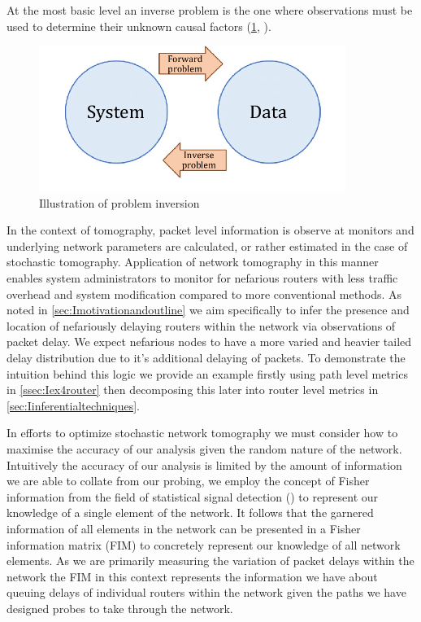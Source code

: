 At the most basic level an inverse problem is the one where observations must be used to determine their unknown causal factors (\cref{fig:probleminv}, \cite{sadri_effect_2019}).
\begin{figure}[H]
    \centering
    \includegraphics[width=10cm]{figs/intro/inverse_problems.png}
    \caption[Illustration of problem inversion]{Illustration of problem inversion \cite{sadri_effect_2019}}
    \label{fig:probleminv}
\end{figure}
In the context of tomography, packet level information is observe at monitors and underlying network parameters are calculated, or rather estimated in the case of stochastic tomography. Application of network tomography in this manner enables system administrators to monitor for nefarious routers with less traffic overhead and system modification compared to more conventional methods. As noted in \cref{sec:Imotivationandoutline} we aim specifically to infer the presence and location of nefariously delaying routers within the network via observations of packet delay. We expect nefarious nodes to have a more varied and heavier tailed delay distribution due to it's additional delaying of packets. To demonstrate the intuition behind this logic we provide an example firstly using path level metrics in \cref{ssec:Iex4router} then decomposing this later into router level metrics in \cref{sec:Iinferentialtechniques}.\par
In efforts to optimize stochastic network tomography we must consider how to maximise the accuracy of our analysis given the random nature of the network. Intuitively the accuracy of our analysis is limited by the amount of information we are able to collate from our probing, we employ the concept of Fisher information from the field of statistical signal detection (\cite{poor_introduction_1994}) to represent our knowledge of a single element of the network. It follows that the garnered information of all elements in the network can be presented in a Fisher information matrix (FIM) to concretely represent our knowledge of all network elements. As we are primarily measuring the variation of packet delays within the network the FIM in this context represents the information we have about queuing delays of individual routers within the network given the paths we have designed probes to take through the network.\par
